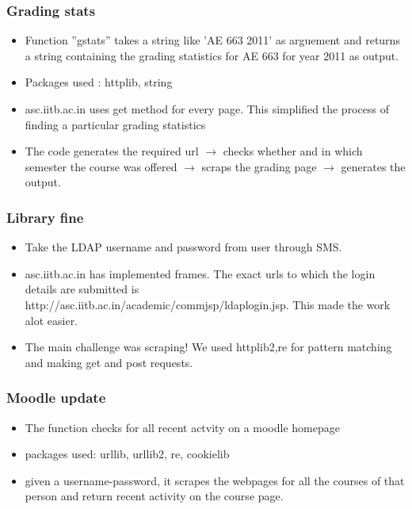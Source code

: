 \documentclass[]{beamer}
\begin{document}
\begin{frame}
	\frametitle{Grading stats}   
  	\begin{itemize}
	\justifying
	\item Function ''gstats'' takes a string like 'AE 663 2011' as arguement and returns a string containing the grading statistics for AE 663 for year 2011 as output.
	\item Packages used : httplib, string
	\item \color{green}asc.iitb.ac.in \color{black} uses get method for every page. This simplified the process of finding a particular grading statistics
	\item The code generates the required url $\rightarrow$ checks whether and in which semester the course was offered $\rightarrow$ scraps the grading page $\rightarrow$ generates the output.
  	\end{itemize}
\end{frame}

\begin{frame}
	\frametitle{Library fine}   
  	\begin{itemize}
	\justifying
	\item Take the LDAP username and password from user through SMS. 
	\item asc.iitb.ac.in has implemented frames. The exact urls to which  the login details are submitted is http://asc.iitb.ac.in/academic/commjsp/ldaplogin.jsp. This made the work alot easier.
	\item The main challenge was scraping! We used httplib2,re for pattern matching and making get and post requests.

  	\end{itemize}
\end{frame}

\begin{frame}
	\frametitle{Moodle update}   
  	\begin{itemize}
	\justifying
	\item The function checks for all recent actvity on a moodle homepage 
	\item packages used: urllib, urllib2, re, cookielib 
	\item given a username-password, it scrapes the webpages for all the courses of that person and return recent activity on the course page. 
  	\end{itemize}
\end{frame}
\end{document}
